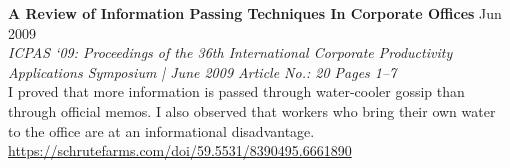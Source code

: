 \textbf{A Review of Information Passing Techniques In Corporate Offices} \hfill Jun 2009\\
\textit{ICPAS ‘09: Proceedings of the 36th International Corporate Productivity Applications Symposium | June 2009 Article No.: 20 Pages 1–7}\\
I proved that more information is passed through water-cooler gossip than through official memos. I also observed that workers who bring their own water to the office are at an informational disadvantage.\\
\href{https://schrutefarms.com/doi/59.5531/8390495.6661890}{https://schrutefarms.com/doi/59.5531/8390495.6661890}
\vspace*{2mm}